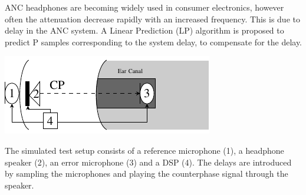 \large
ANC headphones are becoming widely used in consumer electronics, however often the attenuation decrease rapidly with an increased frequency. 
This is due to delay in the ANC system. 
A Linear Prediction (LP) algorithm is proposed to predict P samples corresponding to the system delay, to compensate for the delay.   
\begin{centering}
	\includegraphics[width=\textwidth]{figures/BasicOverviewZoomed.pdf}
\end{centering}
The simulated test setup consists of a reference microphone (1), a headphone speaker (2), an error microphone (3) and a DSP (4). The delays are introduced by sampling the microphones and playing the counterphase signal through the speaker.\\ 